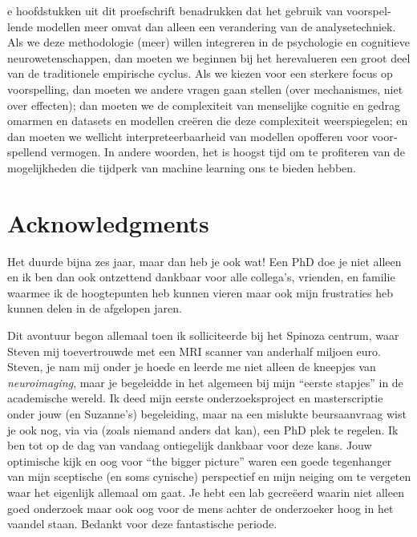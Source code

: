 \documentclass[12pt,american,a4paper,oneside,]{memoir} %
\newenvironment{dutch}[2][]{\begin{otherlanguage}{dutch}}{\end{otherlanguage}}
\begin{document}
\begin{dutch}
De hoofdstukken uit dit proefschrift benadrukken dat het gebruik van voorspellende modellen meer omvat dan alleen een verandering van de analysetechniek. Als we deze methodologie (meer) willen integreren in de psychologie en cognitieve neurowetenschappen, dan moeten we beginnen bij het herevalueren een groot deel van de traditionele empirische cyclus. Als we kiezen voor een sterkere focus op voorspelling, dan moeten we andere vragen gaan stellen (over mechanismes, niet over effecten); dan moeten we de complexiteit van menselijke cognitie en gedrag omarmen en datasets en modellen creëren die deze complexiteit weerspiegelen; en dan moeten we wellicht interpreteerbaarheid van modellen opofferen voor voorspellend vermogen. In andere woorden, het is hoogst tijd om te profiteren van de mogelijkheden die tijdperk van machine learning ons te bieden hebben.

\end{dutch}

\hypertarget{acknowledgments}{%
\chapter*{Acknowledgments}\label{acknowledgments}}


Het duurde bijna zes jaar, maar dan heb je ook wat! Een PhD doe je niet alleen en ik ben dan ook ontzettend dankbaar voor alle collega's, vrienden, en familie waarmee ik de hoogtepunten heb kunnen vieren maar ook mijn frustraties heb kunnen delen in de afgelopen jaren.

Dit avontuur begon allemaal toen ik solliciteerde bij het Spinoza centrum, waar Steven mij toevertrouwde met een MRI scanner van anderhalf miljoen euro. Steven, je nam mij onder je hoede en leerde me niet alleen de kneepjes van \emph{neuroimaging}, maar je begeleidde in het algemeen bij mijn ``eerste stapjes'' in de academische wereld. Ik deed mijn eerste onderzoeksproject en masterscriptie onder jouw (en Suzanne's) begeleiding, maar na een mislukte beursaanvraag wist je ook nog, via via (zoals niemand anders dat kan), een PhD plek te regelen. Ik ben tot op de dag van vandaag ontiegelijk dankbaar voor deze kans. Jouw optimische kijk en oog voor ``the bigger picture'' waren een goede tegenhanger van mijn sceptische (en soms cynische) perspectief en mijn neiging om te vergeten waar het eigenlijk allemaal om gaat. Je hebt een lab gecreëerd waarin niet alleen goed onderzoek maar ook oog voor de mens achter de onderzoeker hoog in het vaandel staan. Bedankt voor deze fantastische periode.
\end{document}

